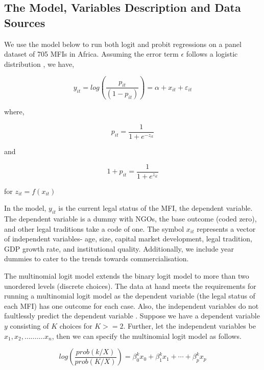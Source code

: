 \documentclass[a4paper,nobind]{templates/ociamthesis}
\begin{document}
\hypertarget{the-model-variables-description-and-data-sources}{%
\subsection{The Model, Variables Description and Data Sources}\label{the-model-variables-description-and-data-sources}}

We use the model below to run both logit and probit regressions on a panel dataset of 705 MFIs in Africa. Assuming the error term \(\epsilon\) follows a logistic distribution \autocite{czepiel2002maximum}, we have,

\begin{equation}
y_{it} = log(\frac{p_{it}}{(1-p_{it})} ) = \alpha + x_{it} + \varepsilon_{it}
\end{equation}

where,

\begin{equation}
p_{it}  =  \frac{1}{1 +  e^{- z_{it} } } 
\end{equation}

and

\begin{equation}
1 + p_{it}  =  \frac{1}{1 +  e^{z_{it} } }
\end{equation}

for \(z_{it} = f(x_{it})\)

In the model, \(y_{it}\) is the current legal status of the MFI, the dependent variable. The dependent variable is a dummy with NGOs, the base outcome (coded zero), and other legal traditions take a code of one. The symbol \(x_{it}\) represents a vector of independent variables- age, size, capital market development, legal tradition, GDP growth rate, and institutional quality. Additionally, we include year dummies to cater to the trends towards commercialisation.

The multinomial logit model extends the binary logit model to more than two unordered levels (discrete choices). The data at hand meets the requirements for running a multinomial logit model as the dependent variable (the legal status of each MFI) has one outcome for each case. Also, the independent variables do not faultlessly predict the dependent variable \autocite{petrucci2009primer}. Suppose we have a dependent variable \(y\) consisting of \(K\) choices for \(K>=2\). Further, let the independent variables be \(x_1, x_2,………. x_n\), then we can specify the multinomial logit model as follows.

\begin{equation}
log(\frac{prob(k/X)}{prob(K/X)}) =   \beta_{0}^{k}  x_{0}  + \beta_{1}^{k}  x_{1} +  \cdots + \beta_{p}^{k}  x_{p}
\end{equation}
\end{document}
